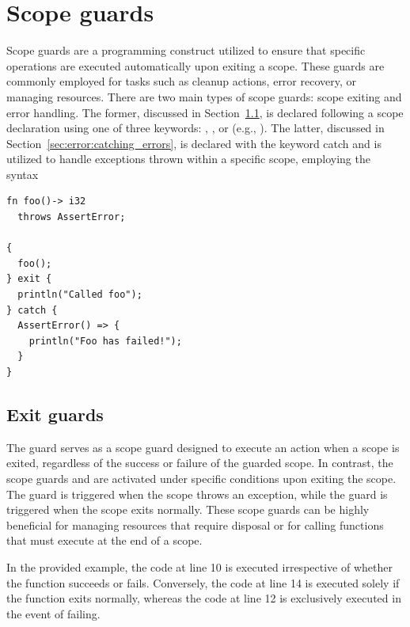 \section{Scope guards}%
\label{sec:error:scope_guards}

Scope guards are a programming construct utilized to ensure that specific
operations are executed automatically upon exiting a scope. These guards are
commonly employed for tasks such as cleanup actions, error recovery, or managing
resources. There are two main types of scope guards: scope exiting and error
handling. The former, discussed in Section~\ref{sec:error:exit_guards}, is declared
following a scope declaration using one of three keywords: ,
, or  (e.g., ). The
latter, discussed in Section~\ref{sec:error:catching_errors}, is declared with the
keyword catch and is utilized to handle exceptions thrown within a specific
scope, employing the syntax 


\begin{lstlisting}[style=coloredverbatim]
fn foo()-> i32
  throws AssertError;

{
  foo();
} exit {
  println("Called foo");
} catch {
  AssertError() => {
    println("Foo has failed!");
  }
}
\end{lstlisting}

\subsection{Exit guards}
\label{sec:error:exit_guards}

The  guard serves as a scope guard designed to execute an action
when a scope is exited, regardless of the success or failure of the guarded
scope. In contrast, the scope guards  and  are
activated under specific conditions upon exiting the scope. The guard
 is triggered when the scope throws an exception, while the guard
 is triggered when the scope exits normally. These scope guards
can be highly beneficial for managing resources that require disposal or for
calling functions that must execute at the end of a scope.

\smallskip

In the provided example, the code at line 10 is executed irrespective of whether
the  function succeeds or fails. Conversely, the code at line 14 is
executed solely if the  function exits normally, whereas the code at
line 12 is exclusively executed in the event of  failing.

